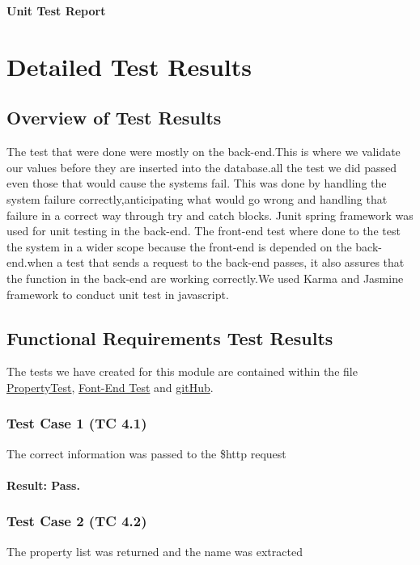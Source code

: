 \documentclass[a4paper,12pt]{article}
\begin{document}
\newpage
\begin{center}
{\huge \bfseries Unit Test Report}\\[0.5cm]
\end{center}
\section{Detailed Test Results}
\subsection{Overview of Test Results}
The test that were done were mostly on the back-end.This is where we validate our values before they are inserted into the database.all the test we did passed even those that would cause the systems fail. This was done by handling the system failure correctly,anticipating what would go wrong and handling that failure in a correct way through try and catch blocks. Junit spring framework was used for unit testing in the back-end. The front-end test where done to the test the system in a wider scope because the front-end is depended on the back-end.when a test that sends a request to the back-end passes, it also assures that the function in the back-end are working correctly.We used Karma and Jasmine framework to conduct unit test in javascript.

\subsection{Functional Requirements Test Results}
The tests we have created for this module are contained within the file   \href{https://github.com/u13278012/IMPAKD/blob/master/Implementation/PIO/BackEnd/test/Test/PropertyTest.java}{PropertyTest}, \href{https://github.com/u13278012/IMPAKD/blob/master/Implementation/PIO/FrontEnd/app/addProperty/addProperty_test.js}{Font-End Test} and \href{https://github.com/u13278012/IMPAKD/}{gitHub}.

\subsubsection{Test Case 1 (TC 4.1)}
The correct information was passed to the \$http request
\paragraph{Result: Pass.}

\subsubsection{Test Case 2 (TC 4.2)}
The property list was returned and the name was extracted
\end{document}
